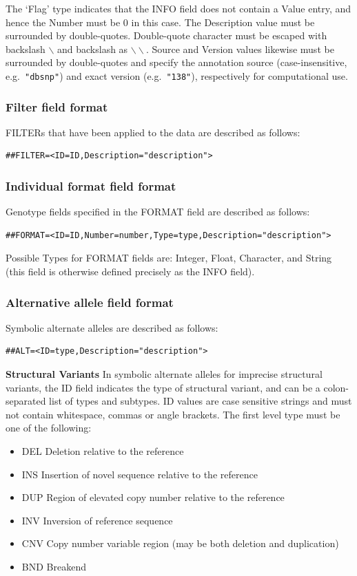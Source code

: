 \documentclass[8pt]{article}
\begin{document}
The `Flag' type indicates that the INFO field does not contain a Value entry, and hence the Number must be $0$ in this case.
The Description value must be surrounded by double-quotes.
Double-quote character must be escaped with backslash $\backslash$ and backslash as $\backslash\backslash$.
Source and Version values likewise must be surrounded by double-quotes and specify the annotation source (case-insensitive, e.g.\ \verb|"dbsnp"|) and exact version (e.g.\ \verb|"138"|), respectively for computational use.

\subsubsection{Filter field format}
FILTERs that have been applied to the data are described as follows:

\begin{verbatim}
##FILTER=<ID=ID,Description="description">
\end{verbatim}

\subsubsection{Individual format field format}
Genotype fields specified in the FORMAT field are described as follows:

\begin{verbatim}
##FORMAT=<ID=ID,Number=number,Type=type,Description="description">
\end{verbatim}

Possible Types for FORMAT fields are: Integer, Float, Character, and String (this field is otherwise defined precisely as the INFO field).

\subsubsection{Alternative allele field format}
Symbolic alternate alleles are described as follows:
\begin{verbatim}
##ALT=<ID=type,Description="description">
\end{verbatim}

\noindent \textbf{Structural Variants} \newline
In symbolic alternate alleles for imprecise structural variants, the ID field indicates the type of structural variant, and can be a colon-separated list of types and subtypes.
ID values are case sensitive strings and must not contain whitespace, commas or angle brackets.
The first level type must be one of the following:
\begin{itemize}
  \item DEL Deletion relative to the reference
  \item INS Insertion of novel sequence relative to the reference
  \item DUP Region of elevated copy number relative to the reference
  \item INV Inversion of reference sequence
  \item CNV Copy number variable region (may be both deletion and duplication)
  \item BND Breakend
\end{itemize}
\end{document}
